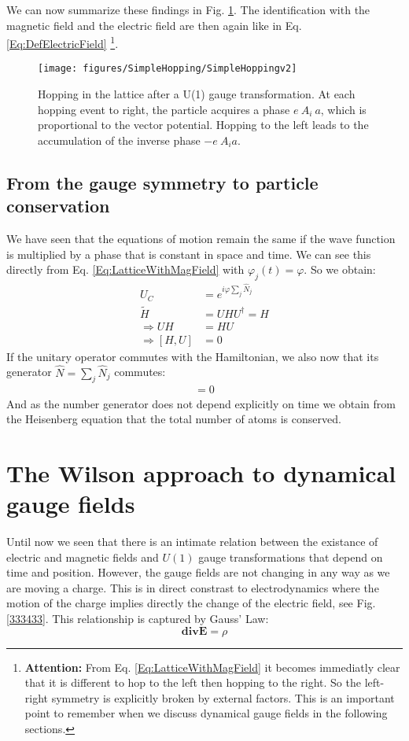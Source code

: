 \documentclass[10pt]{article}
\begin{document}
We can now summarize these findings in Fig. \ref{840410}.  The identification with the magnetic field and the electric field are then again like in Eq. \eqref{Eq:DefElectricField} \footnote{\textbf{Attention:} From Eq. \eqref{Eq:LatticeWithMagField} it becomes immediatly clear that it is different to hop to the left then hopping to the right. So the left-right symmetry is explicitly broken by external factors. This is an important point to remember when we discuss dynamical gauge fields in the following sections.}.
\begin{figure}[h!]
\begin{center}
\texttt{[image: figures/SimpleHopping/SimpleHoppingv2]}
\caption{{Hopping in the lattice after a U(1) gauge transformation. At each
hopping event to right, the particle acquires a phase
\(e\ A_i\ a\), which is proportional to the vector potential.
Hopping to the left leads to the accumulation of the inverse phase
\(-e\ A_ia\).
{\label{840410}}%
}}
\end{center}
\end{figure}


 \subsection{From the gauge symmetry to particle conservation}
 We have seen that the equations of motion remain the same if the wave function is multiplied by a phase that is constant in space and time. We can see this directly from Eq. \eqref{Eq:LatticeWithMagField} with $\varphi_j(t) = \varphi$.
 So we obtain:
 \begin{eqnarray}
 U_C &= e^{i\varphi\sum_j\hat{N}_j }\\
 \tilde{H} &= UHU^\dag  = H\\
 \Rightarrow UH &= HU\\
 \Rightarrow [H,U] &= 0
 \end{eqnarray}
 If the unitary operator commutes with the Hamiltonian, we also now that its generator $\hat{N} = \sum_j\hat{N}_j$ commutes:
 \begin{align}
 [H,\hat{N}] =0
 \end{align}
 And as the number generator does not depend explicitly on time we obtain from the Heisenberg equation that the total number of atoms is conserved.


 \section{The Wilson approach to dynamical gauge fields}\label{Sec:Wilson}
 Until now we seen that there is an intimate relation between the existance of electric and magnetic fields and $U(1)$ gauge transformations that depend on time and position. However, the gauge fields are not changing in any way as we are moving a charge. This is in direct constrast to electrodynamics where the motion of the charge implies directly the change of the electric field, see Fig. \ref{333433}. This relationship is captured by Gauss' Law:
 \begin{equation}\label{Eq:GaussLaw}
 \mathbf{div} \mathbf{E} = \rho
 \end{equation}
 
\end{document}
